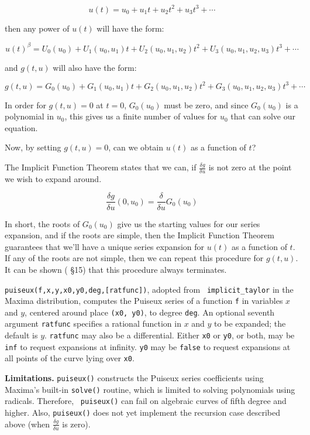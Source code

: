 $$u(t) = u_0 + u_1 t + u_2 t^2 + u_3 t^3 + \cdots$$

then any power of $u(t)$ will have the form:

$$u(t)^\beta = U_0(u_0) + U_1(u_0, u_1) t + U_2(u_0, u_1, u_2) t^2 + U_3(u_0,u_1,u_2,u_3) t^3 + \cdots$$

and $g(t,u)$ will also have the form:

$$g(t,u) = G_0(u_0) + G_1(u_0, u_1) t + G_2(u_0, u_1, u_2) t^2 + G_3(u_0,u_1,u_2,u_3) t^3 + \cdots$$

In order for $g(t,u)=0$ at $t=0$, $G_0(u_0)$ must be zero, and since $G_0(u_0)$ is a polynomial
in $u_0$, this gives us a finite number of values for $u_0$ that can solve our equation.

Now, by setting $g(t,u)=0$, can we obtain $u(t)$ as a function of $t$?

The Implicit Function Theorem states that we can, if $\frac{\delta g}{\delta u}$ is not zero
at the point we wish to expand around.

$$\frac{\delta g}{\delta u}(0,u_0) = \frac{\delta}{\delta u} G_0(u_0)$$

In short, the roots of $G_0(u_0)$ give us the starting values for our series expansion,
and if the roots are simple, then the Implicit Function Theorem guarantees that we'll
have a unique series expansion for $u(t)$ as a function of $t$.  If any of the roots
are not simple, then we can repeat this procedure for $g(t,u)$.  It can be shown
(\cite{bliss} \S 15) that this procedure always terminates.

\vfill\eject

{\tt puiseux(f,x,y,x0,y0,deg,[ratfunc])}, adopted from {\tt
implicit_taylor} in the Maxima distribution, computes the Puiseux
series of a function {\tt f} in variables $x$ and $y$, centered around
place {\tt (x0, y0)}, to degree {\tt deg}.  An optional seventh
argument {\tt ratfunc} specifies a rational function in $x$ and $y$ to
be expanded; the default is $y$.  {\tt ratfunc} may also be a
differential.  Either {\tt x0} or {\tt y0}, or both, may be {\tt inf}
to request expansions at infinity.  {\tt y0} may be {\tt false}
to request expansions at all points of the curve lying over {\tt x0}.

{\bf Limitations.}  {\tt puiseux()} constructs the Puiseux series
coefficients using Maxima's built-in {\tt solve()} routine, which is
limited to solving polynomials using radicals.  Therefore, {\tt
puiseux()} can fail on algebraic curves of fifth degree and higher.
Also, {\tt puiseux()} does not yet implement the recursion case
described above (when $\frac{\delta g}{\delta u}$ is zero).

